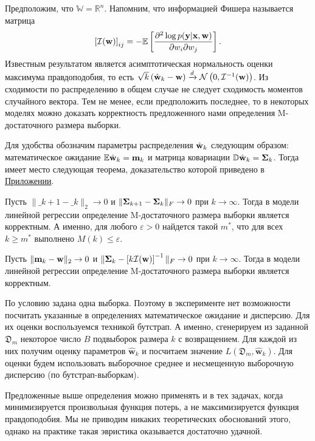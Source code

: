 Предположим, что $\mathbb{W} = \mathbb{R}^n$. Напомним, что информацией Фишера называется матрица
\[ \left[\mathcal{I}(\mathbf{w})\right]_{ij} = - \mathbb{E}\left[ \dfrac{\partial^2 \log p(\mathbf{y} | \mathbf{x}, \mathbf{w})}{\partial w_i \partial w_j} \right]. \]
Известным результатом является асимптотическая нормальность оценки максимума правдоподобия, то есть $\sqrt{k}\left( \hat{\mathbf{w}}_k - \mathbf{w} \right) \xrightarrow{d} \mathcal{N}\left(0, \mathcal{I}^{-1}(\mathbf{w})\right)$. Из сходимости по распределению в общем случае не следует сходимость моментов случайного вектора. Тем не менее, если предположить последнее, то в некоторых моделях можно доказать корректность предложенного нами определения M-достаточного размера выборки.

Для удобства обозначим параметры распределения $\hat{\mathbf{w}}_k$ следующим образом: математическое ожидание $\mathbb{E} \hat{\mathbf{w}}_k = \mathbf{m}_k$ и матрица ковариации $\mathbb{D} \hat{\mathbf{w}}_k = \boldsymbol{\Sigma}_k$. Тогда имеет место следующая теорема, доказательство которой приведено в \hyperref[append]{Приложении}.

\begin{theorem}[Киселев, 2023]\label{theorem1}
    Пусть $\| \bm_{k+1} - \bm_k \|_2 \to 0$ и $\| \boldsymbol{\Sigma}_{k+1} - \boldsymbol{\Sigma}_k \|_{F} \to 0$ при $k \to \infty$. Тогда в модели линейной регрессии определение M-достаточного размера выборки является корректным. А именно, для любого $\varepsilon > 0$ найдется такой $m^*$, что для всех $k \geqslant m^*$ выполнено $M(k) \leqslant \varepsilon$.
\end{theorem}

\begin{corollary}
    Пусть $\| \mathbf{m}_k - \mathbf{w} \|_2 \to 0$ и $\| \boldsymbol{\Sigma}_k - \left[k\mathcal{I}(\mathbf{w})\right]^{-1} \|_{F} \to 0$ при $k \to \infty$. Тогда в модели линейной регрессии определение M-достаточного размера выборки является корректным. 
\end{corollary}

По условию задана одна выборка. Поэтому в эксперименте нет возможности посчитать указанные в определениях математическое ожидание и дисперсию. Для их оценки воспользуемся техникой бутстрап. А именно, сгенерируем из заданной $\mathfrak{D}_m$ некоторое число $B$ подвыборок размера $k$ с возвращением. Для каждой из них получим оценку параметров $\hat{\mathbf{w}}_{k}$ и посчитаем значение $L(\mathfrak{D}_m, \hat{\mathbf{w}}_{k})$. Для оценки будем использовать выборочное среднее и несмещенную выборочную дисперсию (по бутстрап-выборкам).

Предложенные выше определения можно применять и в тех задачах, когда минимизируется произвольная функция потерь, а не максимизируется функция правдоподобия. Мы не приводим никаких теоретических обоснований этого, однако на практике такая эвристика оказывается достаточно удачной.

